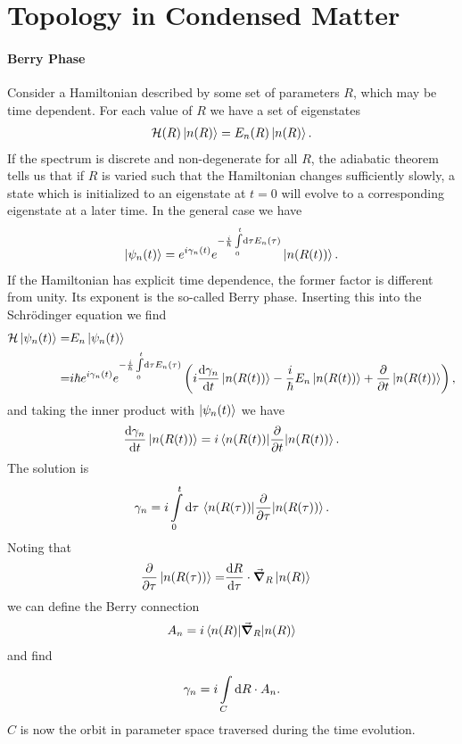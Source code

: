 \section{Topology in Condensed Matter}

\paragraph{Berry Phase}
Consider a Hamiltonian described by some set of parameters $R$, which may be time dependent. For each value of $R$ we have a set of eigenstates
\begin{align*}
	\mathcal{H}(R)\ket{n(R)} = E_{n}(R)\ket{n(R)}.
\end{align*}
If the spectrum is discrete and non-degenerate for all $R$, the adiabatic theorem tells us that if $R$ is varied such that the Hamiltonian changes sufficiently slowly, a state which is initialized to an eigenstate at $t = 0$ will evolve to a corresponding eigenstate at a later time. In the general case we have
\begin{align*}
	\ket{\psi_{n}(t)} = e^{i\gamma_{n}(t)}e^{-\frac{i}{\hbar}\int\limits_{0}^{t}\dd{\tau} E_{n}(\tau)}\ket{n(R(t))}.
\end{align*}
If the Hamiltonian has explicit time dependence, the former factor is different from unity. Its exponent is the so-called Berry phase. Inserting this into the Schrödinger equation we find
\begin{align*}
	\mathcal{H}\ket{\psi_{n}(t)} =& E_{n}\ket{\psi_{n}(t)} \\
	                      =& i\hbar e^{i\gamma_{n}(t)}e^{-\frac{i}{\hbar}\int\limits_{0}^{t}\dd{\tau} E_{n}(\tau)}\left(i\dv{\gamma_{n}}{t}\ket{n(R(t))} - \frac{i}{\hbar}E_{n} \ket{n(R(t))} + \pdv{t}\ket{n(R(t))}\right),
\end{align*}
and taking the inner product with $\ket{\psi_{n}(t)}$ we have
\begin{align*}
	\dv{\gamma_{n}}{t}\ket{n(R(t))} = i\expval{\pdv{t}}{n(R(t))}.
\end{align*}
The solution is
\begin{align*}
	\gamma_{n} = i\int\limits_{0}^{t}\dd{\tau}\expval{\pdv{\tau}}{n(R(\tau))}.
\end{align*}
Noting that
\begin{align*}
	\pdv{\tau}\ket{n(R(\tau))} =& \dv{R}{\tau}\cdot\grad_{R}\ket{n(R)}
\end{align*}
we can define the Berry connection
\begin{align*}
	A_{n} = i\expval{\grad_{R}}{n(R)}
\end{align*}
and find
\begin{align*}
	\gamma_{n} = i\int\limits_{C}^{}\dd{R}\cdot A_{n}.
\end{align*}
$C$ is now the orbit in parameter space traversed during the time evolution.

